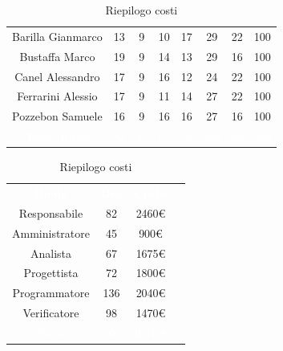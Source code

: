 \begin{table}[htb]
\begin{minipage}[c]{0.53\textwidth}
\begin{tabular}{>{\raggedright\arraybackslash}c|cccccc|c}
		\rowcolor[RGB]{216, 235, 171}
	    	Barilla Gianmarco 	& 13 & 9 & 10 & 17 & 29 & 22 & 100			\\[9pt]
	    \rowcolor[RGB]{233, 245, 206}
	    	Bustaffa Marco 		& 19 & 9 & 14 & 13 & 29 & 16 & 100			\\[9pt]
		\rowcolor[RGB]{216, 235, 171}
	    	Canel Alessandro 	& 17 & 9 & 16 & 12 & 24 & 22 & 100 			\\[9pt]
		\rowcolor[RGB]{233, 245, 206}
	    	Ferrarini Alessio 	& 17 & 9 & 11 & 14 & 27 & 22 & 100			\\[9pt]
		\rowcolor[RGB]{216, 235, 171}
	    	Pozzebon Samuele 	& 16 & 9 & 16 & 16 & 27 & 16 & 100			\\[9pt]
		\rowcolor[RGB]{47, 106, 73}
			\textcolor{white}{Totale Ruolo} & \textcolor{white}{82} & \textcolor{white}{45} & \textcolor{white}{67} 
			& \textcolor{white}{72} & \textcolor{white}{136} & \textcolor{white}{98}
			& \textcolor{white}{500} \\[4pt]	
    \end{tabular}
    \caption{Riepilogo distribuzione oraria}
\end{minipage}
\hfill
\begin{minipage}{0.33\textwidth}
	\centering
	\begin{tabular}{cccc}
	    \rowcolor[RGB]{33, 73, 50}
	    \textcolor{white}{\textbf{Ruolo}} & \textcolor{white}{\textbf{Ore}} & \textcolor{white}{\textbf{Costo}}\\[4pt]
	    \rowcolor[RGB]{216, 235, 171}
	    Responsabile & 82 & 2460\euro\\[4pt]
	    \rowcolor[RGB]{233, 245, 206}
	    Amministratore & 45 & 900\euro\\[4pt]
        \rowcolor[RGB]{216, 235, 171}
	    Analista & 67 & 1675\euro\\[4pt]
	    \rowcolor[RGB]{233, 245, 206}
	    Progettista & 72 & 1800\euro\\[4pt]
        \rowcolor[RGB]{216, 235, 171}
	    Programmatore & 136 & 2040\euro\\[4pt]
	    \rowcolor[RGB]{233, 245, 206}
	    Verificatore & 98 & 1470\euro\\[4pt]
		\rowcolor[RGB]{47, 106, 73}
			\textcolor{white}{Totale} & \textcolor{white}{500} & \textcolor{white}{10345\euro}\\[4pt]	
    \end{tabular}	
	\caption{Riepilogo costi}

\end{minipage}
\end{table}

